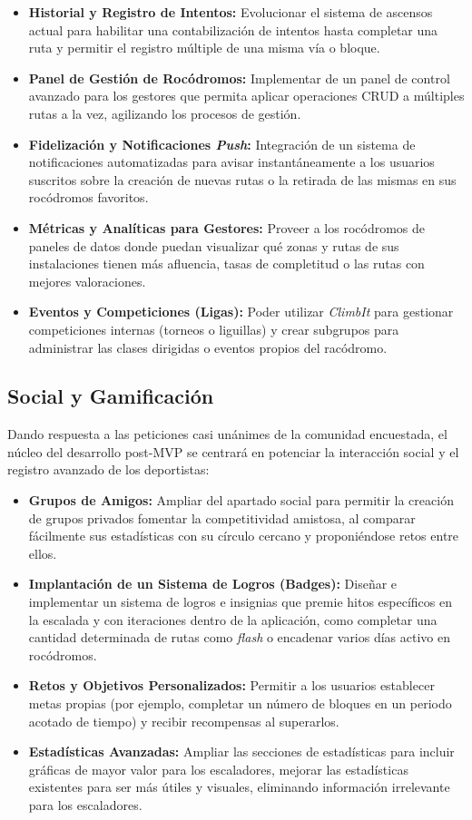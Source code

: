 \begin{itemize}
    \item \textbf{Historial y Registro de Intentos:} Evolucionar el sistema de ascensos actual para habilitar una contabilización de intentos hasta completar una ruta y permitir el registro múltiple de una misma vía o bloque.
    \item \textbf{Panel de Gestión de Rocódromos:} Implementar de un panel de control avanzado para los gestores que permita aplicar operaciones CRUD a múltiples rutas a la vez, agilizando los procesos de gestión.
    \item \textbf{Fidelización y Notificaciones \textit{Push}:} Integración de un sistema de notificaciones automatizadas para avisar instantáneamente a los usuarios suscritos sobre la creación de nuevas rutas o la retirada de las mismas en sus rocódromos favoritos.
    \item \textbf{Métricas y Analíticas para Gestores:} Proveer a los rocódromos de paneles de datos donde puedan visualizar qué zonas y rutas de sus instalaciones tienen más afluencia, tasas de completitud o las rutas con mejores valoraciones.
    \item \textbf{Eventos y Competiciones (Ligas):} Poder utilizar \textit{ClimbIt} para gestionar competiciones internas (torneos o liguillas) y crear subgrupos para administrar las clases dirigidas o eventos propios del racódromo.
\end{itemize}

\subsection{Social y Gamificación}
Dando respuesta a las peticiones casi unánimes de la comunidad encuestada, el núcleo del desarrollo post-MVP se centrará en potenciar la interacción social y el registro avanzado de los deportistas:

\begin{itemize}
    \item \textbf{Grupos de Amigos:} Ampliar del apartado social para permitir la creación de grupos privados fomentar la competitividad amistosa, al comparar fácilmente sus estadísticas con su círculo cercano y proponiéndose retos entre ellos.
    \item \textbf{Implantación de un Sistema de Logros (Badges):} Diseñar e implementar un sistema de logros e insignias que premie hitos específicos en la escalada y con iteraciones dentro de la aplicación, como completar una cantidad determinada de rutas como \textit{flash} o encadenar varios días activo en rocódromos.
    \item \textbf{Retos y Objetivos Personalizados:} Permitir a los usuarios establecer metas propias (por ejemplo, completar un número de bloques en un periodo acotado de tiempo) y recibir recompensas al superarlos.
    \item \textbf{Estadísticas Avanzadas:} Ampliar las secciones de estadísticas para incluir gráficas de mayor valor para los escaladores, mejorar las estadísticas existentes para ser más útiles y visuales, eliminando información irrelevante para los escaladores.
\end{itemize}


